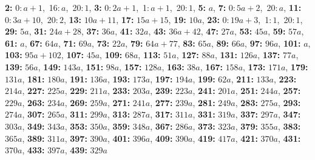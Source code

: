 \textsf{\bfseries 2:} 0:\,$a + 1$,\ 16:\,$a$,\ 20:\,$1$, \textsf{\bfseries 3:} 0:\,$2a + 1$,\ 1:\,$a + 1$,\ 20:\,$1$, \textsf{\bfseries 5:} $a$, \textsf{\bfseries 7:} 0:\,$5a + 2$,\ 20:\,$a$, \textsf{\bfseries 11:} 0:\,$3a + 10$,\ 20:\,$2$, \textsf{\bfseries 13:} $10a + 11$, \textsf{\bfseries 17:} $15a + 15$, \textsf{\bfseries 19:} $10a$, \textsf{\bfseries 23:} 0:\,$19a + 3$,\ 1:\,$1$,\ 20:\,$1$, \textsf{\bfseries 29:} $5a$, \textsf{\bfseries 31:} $24a + 28$, \textsf{\bfseries 37:} $36a$, \textsf{\bfseries 41:} $32a$, \textsf{\bfseries 43:} $36a + 42$, \textsf{\bfseries 47:} $27a$, \textsf{\bfseries 53:} $45a$, \textsf{\bfseries 59:} $57a$, \textsf{\bfseries 61:} $a$, \textsf{\bfseries 67:} $64a$, \textsf{\bfseries 71:} $69a$, \textsf{\bfseries 73:} $22a$, \textsf{\bfseries 79:} $64a + 77$, \textsf{\bfseries 83:} $65a$, \textsf{\bfseries 89:} $66a$, \textsf{\bfseries 97:} $96a$, \textsf{\bfseries 101:} $a$, \textsf{\bfseries 103:} $95a + 102$, \textsf{\bfseries 107:} $45a$, \textsf{\bfseries 109:} $68a$, \textsf{\bfseries 113:} $51a$, \textsf{\bfseries 127:} $88a$, \textsf{\bfseries 131:} $126a$, \textsf{\bfseries 137:} $77a$, \textsf{\bfseries 139:} $56a$, \textsf{\bfseries 149:} $143a$, \textsf{\bfseries 151:} $98a$, \textsf{\bfseries 157:} $128a$, \textsf{\bfseries 163:} $38a$, \textsf{\bfseries 167:} $158a$, \textsf{\bfseries 173:} $171a$, \textsf{\bfseries 179:} $131a$, \textsf{\bfseries 181:} $180a$, \textsf{\bfseries 191:} $136a$, \textsf{\bfseries 193:} $173a$, \textsf{\bfseries 197:} $194a$, \textsf{\bfseries 199:} $62a$, \textsf{\bfseries 211:} $133a$, \textsf{\bfseries 223:} $214a$, \textsf{\bfseries 227:} $225a$, \textsf{\bfseries 229:} $211a$, \textsf{\bfseries 233:} $203a$, \textsf{\bfseries 239:} $223a$, \textsf{\bfseries 241:} $201a$, \textsf{\bfseries 251:} $244a$, \textsf{\bfseries 257:} $229a$, \textsf{\bfseries 263:} $234a$, \textsf{\bfseries 269:} $259a$, \textsf{\bfseries 271:} $241a$, \textsf{\bfseries 277:} $239a$, \textsf{\bfseries 281:} $249a$, \textsf{\bfseries 283:} $275a$, \textsf{\bfseries 293:} $274a$, \textsf{\bfseries 307:} $265a$, \textsf{\bfseries 311:} $299a$, \textsf{\bfseries 313:} $287a$, \textsf{\bfseries 317:} $311a$, \textsf{\bfseries 331:} $319a$, \textsf{\bfseries 337:} $297a$, \textsf{\bfseries 347:} $303a$, \textsf{\bfseries 349:} $343a$, \textsf{\bfseries 353:} $350a$, \textsf{\bfseries 359:} $348a$, \textsf{\bfseries 367:} $286a$, \textsf{\bfseries 373:} $323a$, \textsf{\bfseries 379:} $355a$, \textsf{\bfseries 383:} $365a$, \textsf{\bfseries 389:} $311a$, \textsf{\bfseries 397:} $390a$, \textsf{\bfseries 401:} $396a$, \textsf{\bfseries 409:} $390a$, \textsf{\bfseries 419:} $417a$, \textsf{\bfseries 421:} $370a$, \textsf{\bfseries 431:} $370a$, \textsf{\bfseries 433:} $397a$, \textsf{\bfseries 439:} $329a$